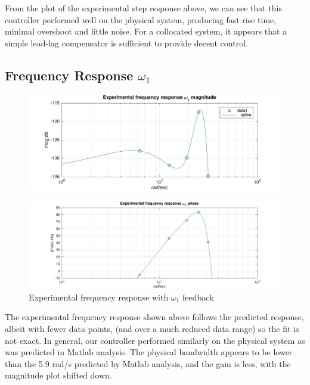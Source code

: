 \documentclass[11pt,titlepage]{article}
\begin{document}
	From the plot of the experimental step response above, we can see that this controller performed well on the physical system, producing fast rise time, minimal overshoot and little noise. For a collocated system, it appears that a simple lead-lag compensator is sufficient to provide decent control.
	
	\subsection{Frequency Response $\omega_1$}

	\begin{figure}[H]
        		\centering
        		\includegraphics[trim={0cm 0 0cm 0cm},clip,origin=c,scale=0.35]{w1_exp_mag}
        		\label{fig:w1_exp_mag}
    	\end{figure}
	\begin{figure}[H]
        		\centering
        		\includegraphics[trim={0cm 0 0cm 0cm},clip,origin=c,scale=0.27]{w1_exp_freq}
        		\caption{Experimental frequency response with $\omega_1$ feedback}
        		\label{fig:w1_exp_freq}
    	\end{figure}

The experimental frequency response shown above follows the predicted response, albeit with fewer data points, (and over a much reduced data range) so the fit is not exact. In general, our controller performed similarly on the physical system as was predicted in Matlab analysis. The physical bandwidth appears to be lower than the 5.9 rad/s predicted by Matlab analysis, and the gain is less, with the magnitude plot shifted down. 
\end{document}
